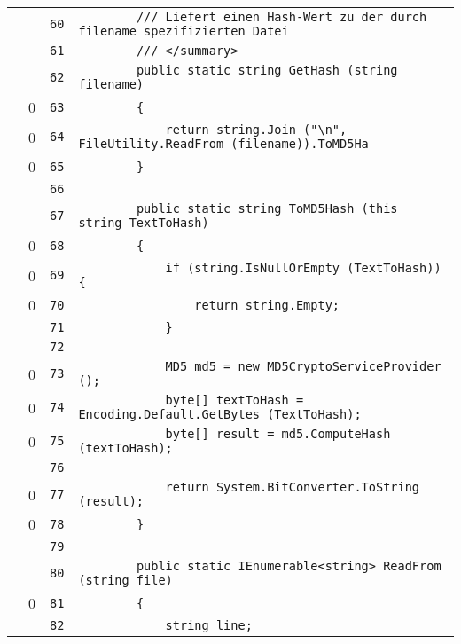 \documentclass[a4paper,10pt]{article}
\begin{document}
\begin{longtable}[l]{lrrl}
\cellcolor{gray} &  & \verb~60~ & \verb~        /// Liefert einen Hash-Wert zu der durch filename spezifizierten Datei~\\
\cellcolor{gray} &  & \verb~61~ & \verb~        /// </summary>~\\
\cellcolor{gray} &  & \verb~62~ & \verb~        public static string GetHash (string filename)~\\
\cellcolor{red} & 0 & \verb~63~ & \verb~        {~\\
\cellcolor{red} & 0 & \verb~64~ & \verb~            return string.Join ("\n", FileUtility.ReadFrom (filename)).ToMD5Ha~\\
\cellcolor{red} & 0 & \verb~65~ & \verb~        }~\\
\cellcolor{gray} &  & \verb~66~ & \verb~~\\
\cellcolor{gray} &  & \verb~67~ & \verb~        public static string ToMD5Hash (this string TextToHash)~\\
\cellcolor{red} & 0 & \verb~68~ & \verb~        {~\\
\cellcolor{red} & 0 & \verb~69~ & \verb~            if (string.IsNullOrEmpty (TextToHash)) {~\\
\cellcolor{red} & 0 & \verb~70~ & \verb~                return string.Empty;~\\
\cellcolor{gray} &  & \verb~71~ & \verb~            }~\\
\cellcolor{gray} &  & \verb~72~ & \verb~~\\
\cellcolor{red} & 0 & \verb~73~ & \verb~            MD5 md5 = new MD5CryptoServiceProvider ();~\\
\cellcolor{red} & 0 & \verb~74~ & \verb~            byte[] textToHash = Encoding.Default.GetBytes (TextToHash);~\\
\cellcolor{red} & 0 & \verb~75~ & \verb~            byte[] result = md5.ComputeHash (textToHash);~\\
\cellcolor{gray} &  & \verb~76~ & \verb~~\\
\cellcolor{red} & 0 & \verb~77~ & \verb~            return System.BitConverter.ToString (result);~\\
\cellcolor{red} & 0 & \verb~78~ & \verb~        }~\\
\cellcolor{gray} &  & \verb~79~ & \verb~~\\
\cellcolor{gray} &  & \verb~80~ & \verb~        public static IEnumerable<string> ReadFrom (string file)~\\
\cellcolor{red} & 0 & \verb~81~ & \verb~        {~\\
\cellcolor{gray} &  & \verb~82~ & \verb~            string line;~\\

\end{longtable}
\end{document}

